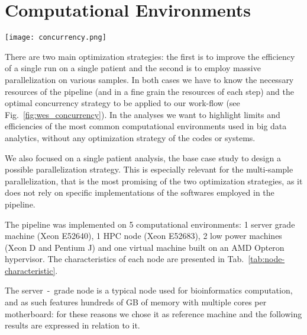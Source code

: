 \documentclass{standalone}
\begin{document}
\section*{Computational Environments}

\begin{figure*}
\centering
\texttt{[image: concurrency.png]}
\caption{Examples of concurrency work-flow of two processes.
The first case ($a$) represents a simple (naive) sequential work-flow; the second ($b$) highlights a brute force parallelization; the third ($c$) is the case of a perfect match between the available resources and the requested resources.
Often brute force parallelization of pipelines done as in the image $b$ ends up overlapping the most computationally intensive steps.
Measuring the minimum viable requirements for the execution allow to better allocate resources as seen in the image $c$.}
\label{fig:wes_concurrency}
\end{figure*}

There are two main optimization strategies: the first is to improve the efficiency of a single run on a single patient and the second is to employ massive parallelization on various samples.
In both cases we have to know the necessary resources of the pipeline (and in a fine grain the resources of each step) and the optimal concurrency strategy to be applied to our work-flow (see Fig.~\ref{fig:wes_concurrency}).
In the analyses we want to highlight limits and efficiencies of the most common computational environments used in big data analytics, without any optimization strategy of the codes or systems.

We also focused on a single patient analysis, the base case study to design a possible parallelization strategy.
This is especially relevant for the multi-sample parallelization, that is the most promising of the two optimization strategies, as it does not rely on specific implementations of the softwares employed in the pipeline.

The pipeline was implemented on 5 computational environments: 1 server grade machine (Xeon E52640), 1 HPC node (Xeon E52683), 2 low power machines (Xeon D and Pentium J) and one virtual machine built on an AMD Opteron hypervisor.
The characteristics of each node are presented in Tab.~\ref{tab:node-characteristic}.

The server~-~grade node is a typical node used for bioinformatics computation, and as such features hundreds of GB of memory with multiple cores per motherboard: for these reasons we chose it as reference machine and the following results are expressed in relation to it.
\end{document}

